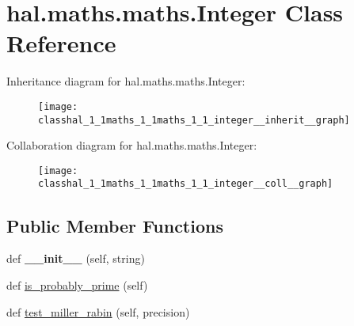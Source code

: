 \hypertarget{classhal_1_1maths_1_1maths_1_1_integer}{}\section{hal.\+maths.\+maths.\+Integer Class Reference}
\label{classhal_1_1maths_1_1maths_1_1_integer}


Inheritance diagram for hal.\+maths.\+maths.\+Integer\+:\nopagebreak
\begin{figure}[H]
\begin{center}
\leavevmode
\texttt{[image: classhal\_1\_1maths\_1\_1maths\_1\_1\_integer\_\_inherit\_\_graph]}
\end{center}
\end{figure}


Collaboration diagram for hal.\+maths.\+maths.\+Integer\+:\nopagebreak
\begin{figure}[H]
\begin{center}
\leavevmode
\texttt{[image: classhal\_1\_1maths\_1\_1maths\_1\_1\_integer\_\_coll\_\_graph]}
\end{center}
\end{figure}
\subsection*{Public Member Functions}
\begin{DoxyCompactItemize}
\item 
def {\bfseries \+\_\+\+\_\+init\+\_\+\+\_\+} (self, string)\hypertarget{classhal_1_1maths_1_1maths_1_1_integer_ab02daf8f7df66b9739514805740d2e29}{}\label{classhal_1_1maths_1_1maths_1_1_integer_ab02daf8f7df66b9739514805740d2e29}

\item 
def \hyperlink{classhal_1_1maths_1_1maths_1_1_integer_a813e392f81a6c01f87a9ef8d1c8c1250}{is\+\_\+probably\+\_\+prime} (self)
\item 
def \hyperlink{classhal_1_1maths_1_1maths_1_1_integer_a3cd7d69cc1e8bb8271e61bbeba6d2a50}{test\+\_\+miller\+\_\+rabin} (self, precision)
\end{DoxyCompactItemize}
